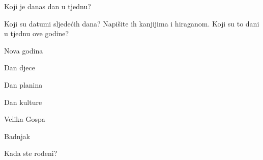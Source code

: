 
\author{Ivan Petranović}

	
	\vspace{15pt}
	\noindent Koji je danas dan u tjednu?
	
	\vspace{15pt}
	\noindent Koji su datumi sljedećih dana? Napišite ih kanjijima i hiraganom. Koji su to dani u tjednu ove godine?
	
	\begin{mondai}{}
		\item Nova godina
		\item Dan djece
		\item Dan planina
		\item Dan kulture
		\item Velika Gospa
		\item Badnjak
	\end{mondai}

	\vspace{15pt}
	\noindent Kada ste rođeni?
